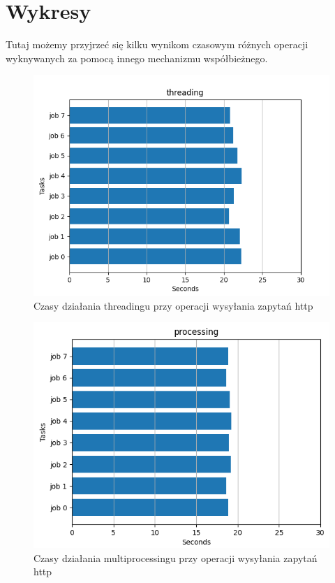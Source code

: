 \section{Wykresy}
Tutaj możemy przyjrzeć się kilku wynikom czasowym różnych operacji wyknywanych za pomocą innego mechanizmu współbieżnego.
\begin{figure}[h]
    \includegraphics{zdjecia/threading_requests}
    \caption{Czasy działania threadingu przy operacji wysyłania zapytań http}
\end{figure}

\begin{figure}
    \includegraphics{zdjecia/processing_requests}
    \caption{Czasy działania multiprocessingu przy operacji wysyłania zapytań http}
\end{figure}

